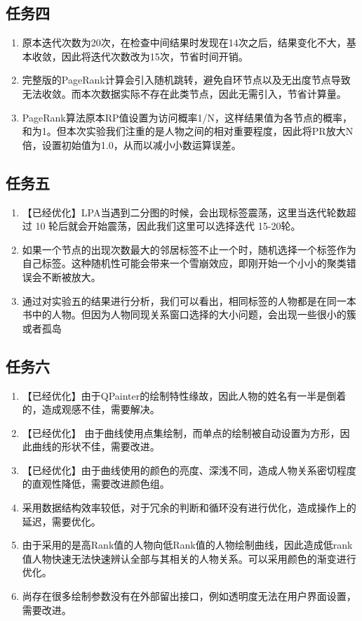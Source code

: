 \documentclass[a4paper,UTF8]{article}
\numberwithin{equation}{section}
\begin{document}
\subsection{任务四}
\begin{enumerate}[1)]
    \item 原本迭代次数为20次，在检查中间结果时发现在14次之后，结果变化不大，基本收敛，因此将迭代次数改为15次，节省时间开销。
    \item 完整版的PageRank计算会引入随机跳转，避免自环节点以及无出度节点导致无法收敛。而本次数据实际不存在此类节点，因此无需引入，节省计算量。
    \item PageRank算法原本RP值设置为访问概率1/N，这样结果值为各节点的概率，和为1。但本次实验我们注重的是人物之间的相对重要程度，因此将PR放大N倍，设置初始值为1.0，从而以减小小数运算误差。
\end{enumerate}
\subsection{任务五}
\begin{enumerate}[1)]
   \item 【已经优化】LPA当遇到二分图的时候，会出现标签震荡，这里当迭代轮数超过 10 轮后就会开始震荡，因此我们这里可以选择迭代 15-20轮。
   \item 如果一个节点的出现次数最大的邻居标签不止一个时，随机选择一个标签作为自己标签。这种随机性可能会带来一个雪崩效应，即刚开始一个小小的聚类错误会不断被放大。
   \item 通过对实验五的结果进行分析，我们可以看出，相同标签的人物都是在同一本书中的人物。但因为人物同现关系窗口选择的大小问题，会出现一些很小的簇或者孤岛
\end{enumerate}
\subsection{任务六}
\begin{enumerate}[1)]
    \item 【已经优化】由于QPainter的绘制特性缘故，因此人物的姓名有一半是倒着的，造成观感不佳，需要解决。
    \item 【已经优化】 由于曲线使用点集绘制，而单点的绘制被自动设置为方形，因此曲线的形状不佳，需要改进。
    \item 【已经优化】由于曲线使用的颜色的亮度、深浅不同，造成人物关系密切程度的直观性降低，需要改进颜色组。
    \item 采用数据结构效率较低，对于冗余的判断和循环没有进行优化，造成操作上的延迟，需要优化。
    \item 由于采用的是高Rank值的人物向低Rank值的人物绘制曲线，因此造成低rank 值人物快速无法快速辨认全部与其相关的人物关系。可以采用颜色的渐变进行优化。
    \item 尚存在很多绘制参数没有在外部留出接口，例如透明度无法在用户界面设置，需要改进。
\end{enumerate}
\end{document}

